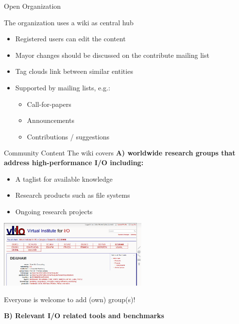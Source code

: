 \documentclass[portrait,a0paper,fontscale=0.4]{baposter}
\newcommand{\compresslist}{%
\setlength{\itemsep}{1pt}%
\setlength{\parskip}{0pt}%
\setlength{\parsep}{0pt}%
}
\begin{document}
\begin{poster}
\begin{posterbox}[name=overview,column=0,below=approach]{Open Organization}

The organization uses a wiki as central hub
\vspace*{-1em}
\begin{itemize}\compresslist
\item Registered users can edit the content
\item Mayor changes should be discussed on the contribute mailing list
\item Tag clouds link between similar entities
\item Supported by mailing lists, e.g.:
\begin{itemize}\compresslist
\item Call-for-papers
\item Announcements
\item Contributions / suggestions
\end{itemize}
\end{itemize}

\end{posterbox}


\begin{posterbox}[name=wps,column=0,below=overview, above=bottom]{Community Content}
The wiki covers \textbf{A) worldwide research groups that address high-performance I/O including:}

\vspace*{-1em}
\begin{itemize}\compresslist
\item A taglist for available knowledge
\item Research products such as file systems
\item Ongoing research projects
\end{itemize}

\vspace*{-0.5em}

\includegraphics[width=7.5cm]{groups}

Everyone is welcome to add (own) group(s)!

\textbf{B) Relevant I/O related tools and benchmarks}


\end{posterbox}
\end{poster}
\end{document}
